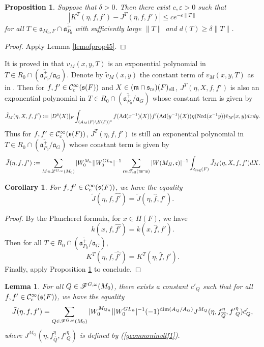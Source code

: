 \documentclass[a4paper]{amsart}
\newcommand{\fa}{{\mathfrak{a}}} \newcommand{\fb}{{\mathfrak{b}}}\newcommand{\fc}{{\mathfrak{c}}} \newcommand{\fd}{{\mathfrak{d}}}
\newcommand{\fm}{{\mathfrak{m}}} \newcommand{\fn}{{\mathfrak{n}}}\newcommand{\fo}{{\mathfrak{o}}} \newcommand{\fp}{{\mathfrak{p}}}
\newcommand{\ov}{\overline}
\newtheorem{coro}[thm]{Corollary}
\newtheorem{lem}[thm]{Lemma}
\newtheorem{prop}[thm]{Proposition}
\theoremstyle{definition}
\theoremstyle{remark}
\numberwithin{equation}{subsection}
\begin{document}
\begin{prop}\label{prop45}
Suppose that $\delta>0$. Then there exist $c,\varepsilon>0$ such that
$$ |K^T(\eta, f, f')-J^T(\eta, f, f')| \leq c e^{-\varepsilon\| T\|} $$
for all $T\in\fa_{M_0,F}\cap\ov{\fa_{P_0}^+}$ with sufficiently large $\|T\|$ and $d(T)\geq\delta\| T\|$. 
\end{prop}

\begin{proof}
Apply Lemma \ref{lemofprop45}. 
\end{proof}

It is proved in \cite[(6.5) in p. 46]{MR1114210} that $v_M(x,y,T)$ is an exponential polynomial in $T\in R_0\cap(\ov{\fa_{P_0}^+}/\fa_G)$. 
Denote by $\tilde{v}_M(x, y)$ the constant term of $v_M(x, y, T)$ as in \cite[(6.6) in p. 46]{MR1114210}. Then for $f,f'\in{\mathcal {C}}_c^\infty({\mathfrak{s}}(F))$ and $X\in(\fm\cap\fs_\rs)(F)_\el$, $J^T(\eta, X, f, f')$ is also an exponential polynomial in $T\in R_0\cap(\ov{\fa_{P_0}^+}/\fa_G)$ whose constant term is given by
\begin{equation}\label{cstsecondwoi}
 \tilde{J}_M(\eta, X, f, f'):=|D^{\mathfrak{s}}(X)|_F \int_{(A_M(F)\backslash H(F))^2} f({\mathrm{Ad}}(x^{-1})(X)) f'({\mathrm{Ad}}(y^{-1})(X)) \eta({\mathrm{Nrd}}(x^{-1}y)) \tilde{v}_M(x, y) dx dy. 
\end{equation}
Thus for $f,f'\in{\mathcal {C}}_c^\infty({\mathfrak{s}}(F))$, $J^T(\eta, f, f')$ is still an exponential polynomial in $T\in R_0\cap(\ov{\fa_{P_0}^+}/\fa_G)$ whose constant term is given by
\begin{equation}\label{cstsecondgeom}
 \tilde{J}(\eta, f, f'):=\sum_{M\in\msl^{G,\omega}(M_0)} |W_0^{M_n}| |W_0^{GL_n}|^{-1} \sum_{\fc\in\mst_\el(\fm\cap\fs)} |W(M_H, \fc)|^{-1} \int_{\fc_\reg(F)} \tilde{J}_M(\eta, X, f, f') dX. 
\end{equation}

\begin{coro}\label{corV.4}
For $f,f'\in{\mathcal {C}}_c^\infty({\mathfrak{s}}(F))$, we have the equality
$$ \tilde{J}(\eta, f, \hat{f'})=\tilde{J}(\eta, \hat{f}, f'). $$
\end{coro}

\begin{proof}
By the Plancherel formula, for $x\in H(F)$, we have
$$ k(x, f, \hat{f'})=k(x, \hat{f}, f'). $$
Then for all $T\in R_0\cap(\ov{\fa_{P_0}^+}/\fa_G)$, 
$$ K^T(\eta, f, \hat{f'})=K^T(\eta, \hat{f}, f'). $$
Finally, apply Proposition \ref{prop45} to conclude. 
\end{proof}

\begin{lem}\label{lemV.5}
For all $Q\in\mathscr{F}^{G,\omega}(M_0)$, there exists a constant $c'_Q$ such that for all $f,f'\in{\mathcal {C}}_c^\infty({\mathfrak{s}}(F))$, we have the equality
$$ \tilde{J}(\eta, f, f')=\sum_{Q\in\msf^{G,\omega}(M_0)} |W_0^{M_{Q_n}}| |W_0^{GL_n}|^{-1} (-1)^{\dim(A_Q/A_G)}J^{M_Q}(\eta,f_{\ov{Q}}^\eta,{f'}_Q^\eta)c'_Q, $$
where $J^{M_Q}(\eta,f_{\ov{Q}}^\eta,{f'}_Q^\eta)$ is defined by (\ref{geomnoninvltf1}). 
\end{lem}
\end{document}
